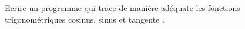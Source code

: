 \bexo

Ecrire un programme qui trace de manière adéquate les fonctions\\  trigonométriques cosinus, sinus et tangente .

\eexo
\solution{
}
